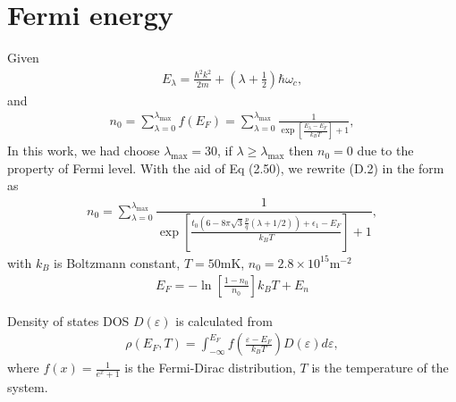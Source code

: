 \documentclass{report}
\newcommand{\f}[2]{\dfrac{#1}{#2}}
\begin{document}
\chapter{Fermi energy}
Given
\begin{gather}
	E_{\lambda} = \frac{\hbar^{2} k^{2}}{2m} + \left(\lambda + \frac{1}{2}\right) \hbar \omega_{c},
\end{gather}
and
\begin{gather}
	n_{0} = \sum_{\lambda=0}^{\lambda_{\text{max}}} f(E_{F}) = \sum_{\lambda=0}^{\lambda_{\text{max}}} \tfrac{1}{\exp[\frac{E_{\lambda} - E_{F}}{k_{B}T}] + 1},
\end{gather}
In this work, we had choose $\lambda_{\text{max}} = 30$, if $\lambda \geq \lambda_{\text{max}}$ then $n_{0} = 0$ due to the property of Fermi level. With the aid of Eq (2.50), we rewrite (D.2) in the form as
\begin{gather}
	n_{0} = \sum_{ \lambda = 0}^{\lambda_{\text{max}}} \f{1}{\exp[\tfrac{t_{0} \left(6 - 8\pi\sqrt{3} \frac{p}{q}( \lambda + 1 /2)\right) + \epsilon_{1} - E_{F}}{k_{B} T}] + 1},
\end{gather}
with $k_{B}$ is Boltzmann constant, $T= 50$mK, $n_{0} = 2.8\times10^{15}$m$^{-2}$
\begin{equation}
	\begin{aligned}
		E_{F} = - \ln\left[\frac{1-n_{0}}{n_{0}}\right] k_{B}T + E_{n}
	\end{aligned}
\end{equation}

Density of states DOS $D(\varepsilon)$ is calculated from
\begin{gather}
	\rho(E_{F},T) = \int_{-\infty}^{E_{F}} f\left(\frac{\varepsilon - E_{F}}{k_{B}T}\right) D(\varepsilon) d\varepsilon,
\end{gather}
where $f(x) = \frac{1}{e^{x} + 1}$ is the Fermi-Dirac distribution, $T$ is the temperature of the system.
\end{document}

